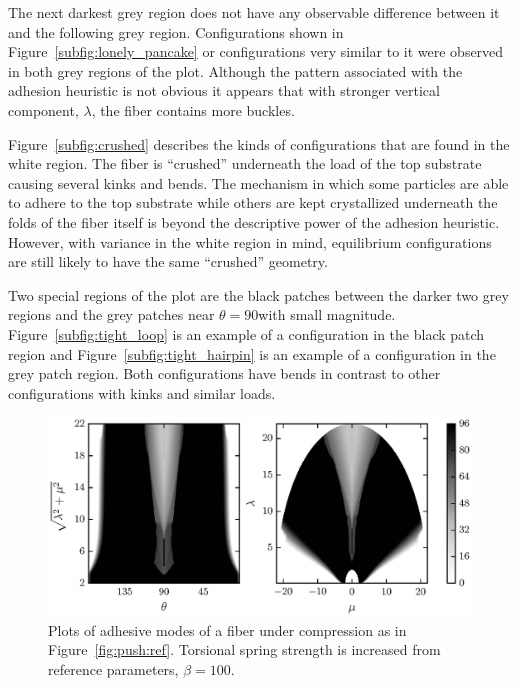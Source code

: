 The next darkest grey region does not have any observable difference between it and the following grey region. Configurations shown in Figure~\ref{subfig:lonely_pancake} or configurations very similar to it were observed in both grey regions of the plot. Although the pattern associated with the adhesion heuristic is not obvious it appears that with stronger vertical component, $\lambda$, the fiber contains more buckles.

Figure~\ref{subfig:crushed} describes the kinds of configurations that are found in the white region. The fiber is ``crushed'' underneath the load of the top substrate causing several kinks and bends. The mechanism in which some particles are able to adhere to the top substrate while others are kept crystallized underneath the folds of the fiber itself is beyond the descriptive power of the adhesion heuristic. However, with variance in the white region in mind, equilibrium configurations are still likely to have the same ``crushed'' geometry.

Two special regions of the plot are the black patches between the darker two grey regions and the grey patches near $\theta=90$\textdegree with small magnitude. Figure~\ref{subfig:tight_loop} is an example of a configuration in the black patch region and Figure~\ref{subfig:tight_hairpin} is an example of a configuration in the grey patch region. Both configurations have bends in contrast to other configurations with kinks and similar loads.

	\begin{figure}[t]
		\begin{center}
			\includegraphics{./fig/ch3/push/b100/grid.eps}
		\end{center}		
		\caption{Plots of adhesive modes of a fiber under compression as in Figure~\ref{fig:push:ref}. Torsional spring strength is increased from reference parameters, $\beta=100$.
		\label{fig:push:b100}}
	\end{figure}	
	
